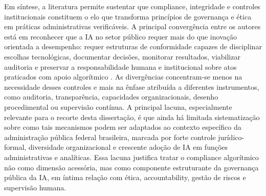 \documentclass[12pt,a4paper]{article}
\begin{document}
Em síntese, a literatura permite sustentar que compliance, integridade e controles institucionais constituem o elo que transforma princípios de governança e ética em práticas administrativas verificáveis. A principal convergência entre os autores está em reconhecer que a IA no setor público requer mais do que inovação orientada a desempenho: requer estruturas de conformidade capazes de disciplinar escolhas tecnológicas, documentar decisões, monitorar resultados, viabilizar auditoria e preservar a responsabilidade humana e institucional sobre atos praticados com apoio algorítmico \autocite{serra2024a} \autocite{madan2022ai} \autocite{batool2025ai} \autocite{mkander2023auditing}. As divergências concentram-se menos na necessidade desses controles e mais na ênfase atribuída a diferentes instrumentos, como auditoria, transparência, capacidades organizacionais, desenho procedimental ou supervisão contínua. A principal lacuna, especialmente relevante para o recorte desta dissertação, é que ainda há limitada sistematização sobre como tais mecanismos podem ser adaptados ao contexto específico da administração pública federal brasileira, marcada por forte controle jurídico-formal, diversidade organizacional e crescente adoção de IA em funções administrativas e analíticas. Essa lacuna justifica tratar o compliance algorítmico não como dimensão acessória, mas como componente estruturante da governança pública da IA, em íntima relação com ética, accountability, gestão de riscos e supervisão humana.
\end{document}
